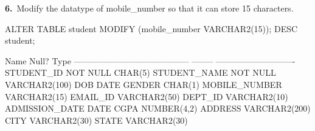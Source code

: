 
\noindent\begin{minipage}{\linewidth}
\begingroup{}
{\fontsize{14}{17}\selectfont\textbf{6.}}\ Modify the datatype of mobile\_number so that it can store 15 characters.\par
\endgroup\vspace{12pt}


\begin{sqlcode}
ALTER TABLE student MODIFY (mobile_number VARCHAR2(15));
DESC student;
\end{sqlcode}

\vspace{18pt}


\begin{sqlout}
 Name                                      Null?    Type
 ----------------------------------------- -------- ----------------------------
 STUDENT_ID                                NOT NULL CHAR(5)
 STUDENT_NAME                              NOT NULL VARCHAR2(100)
 DOB                                                DATE
 GENDER                                             CHAR(1)
 MOBILE_NUMBER                                      VARCHAR2(15)
 EMAIL_ID                                           VARCHAR2(50)
 DEPT_ID                                            VARCHAR2(10)
 ADMISSION_DATE                                     DATE
 CGPA                                               NUMBER(4,2)
 ADDRESS                                            VARCHAR2(200)
 CITY                                               VARCHAR2(30)
 STATE                                              VARCHAR2(30)
\end{sqlout}
\end{minipage}\par\vspace{30pt}

